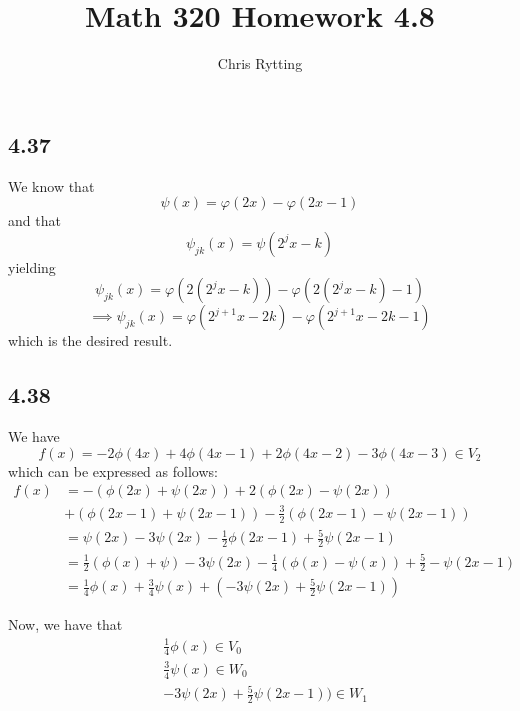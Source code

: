 \documentclass[letterpaper,12pt]{article}
\theoremstyle{definition}
\begin{document}
\title{Math 320 Homework 4.8}
\author{Chris Rytting}
\maketitle

\subsection*{4.37}
We know that 
\[ \psi ( x) = \varphi(2x) - \varphi(2x-1)\]
and that
\[ \psi_{jk} (x) = \psi(2^jx - k) \]
yielding
\[ \psi_{jk} (x) = \varphi(2(2^jx - k)) - \varphi(2(2^jx - k)-1)\]
\[\implies  \psi_{jk} (x) = \varphi(2^{j+1}x - 2k) - \varphi(2^{j+1}x - 2k-1)\]
which is the desired result.


\subsection*{4.38}


We have \[f(x) = -2 \phi (4x) + 4 \phi(4x-1) + 2 \phi(4x-2) - 3 \phi(4x-3) \in V_2\]
which can be expressed as follows:
\begin{align*}
    f(x) & = -(\phi(2x) + \psi(2x)) + 2(\phi(2x) - \psi(2x)) \\
    &+ (\phi(2x-1) + \psi(2x-1) ) - \frac{3}{2}(\phi(2x-1) - \psi(2x-1) ) \\
    & = \psi(2x) - 3 \psi(2x) - \frac{1}{2} \phi(2x-1) + \frac{5}{2} \psi(2x-1) \\
    & = \frac{1}{2} (\phi(x) + \psi) - 3 \psi(2x) - \frac{1}{4}(\phi(x) - \psi(x) ) + \frac{5}{2}-\psi(2x-1) \\
    & = \frac{1}{4}\phi(x) + \frac{3}{4}\psi(x) + (-3\psi(2x)+ \frac{5}{2} \psi(2x-1) )
\end{align*}

Now, we have that
\begin{align*}
    &\frac{1}{4} \phi(x) \in V_0\\
    &\frac{3}{4}\psi(x) \in W_0\\
    &-3\psi(2x) + \frac{5}{2} \psi (2x-1) ) \in W_1
\end{align*}
\end{document}
